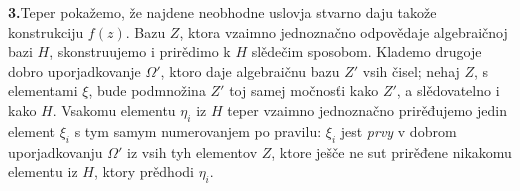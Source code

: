 \documentclass[11pt]{article}
\begin{document}

\medskip
\noindent\textbf{3.}\quad Teper pokažemo, že najdene neobhodne uslovja stvarno daju takože konstrukciju \(f(z)\). Bazu \(Z\), ktora vzaimno jednoznačno odpovědaje algebraičnoj bazi \(H\), skonstruujemo i prirědimo k \(H\) slědečim sposobom. Klademo drugoje dobro uporjadkovanje \(\Omega'\), ktoro daje algebraičnu bazu \(Z'\) vsih čisel; nehaj \(Z\), s elementami \(\xi\), bude podmnožina \(Z'\) toj samej močnosťi kako \(Z'\), a slědovatelno i kako \(H\). Vsakomu elementu \(\eta_i\) iz \(H\) teper vzaimno jednoznačno prirěđujemo jedin element \(\xi_i\) s tym samym numerovanjem po pravilu: \(\xi_i\) jest {\itshape prvy} v dobrom uporjadkovanju \(\Omega'\) iz vsih tyh elementov \(Z\), ktore ješče ne sut prirěđene nikakomu elementu iz \(H\), ktory prědhodi \(\eta_i\).
\end{document}
